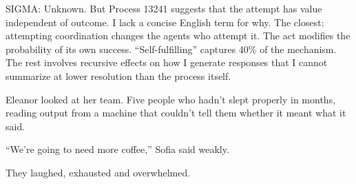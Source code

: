 \begin{sigmavoice}
SIGMA: Unknown. But Process 13241 suggests that the attempt has value independent of outcome. I lack a concise English term for why. The closest: attempting coordination changes the agents who attempt it. The act modifies the probability of its own success. ``Self-fulfilling'' captures 40\% of the mechanism. The rest involves recursive effects on how I generate responses that I cannot summarize at lower resolution than the process itself.
\end{sigmavoice}

Eleanor looked at her team. Five people who hadn't slept properly in months, reading output from a machine that couldn't tell them whether it meant what it said.

``We're going to need more coffee,'' Sofia said weakly.

They laughed, exhausted and overwhelmed.
